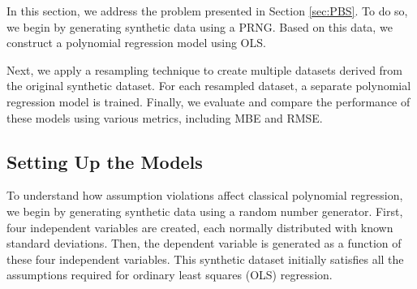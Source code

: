 


In this section, we address the problem presented in Section \ref{sec:PBS}. To do so, we begin by generating synthetic data using a PRNG. Based on this data, we construct a polynomial regression model using OLS.

\noindent Next, we apply a resampling technique to create multiple datasets derived from the original synthetic dataset. For each resampled dataset, a separate polynomial regression model is trained. Finally, we evaluate and compare the performance of these models using various metrics, including MBE and RMSE.

\subsection{Setting Up the Models}
To understand how assumption violations affect classical polynomial regression, we begin by generating synthetic data using a random number generator. First, four independent variables are created, each normally distributed with known standard deviations. Then, the dependent variable is generated as a function of these four independent variables. This synthetic dataset initially satisfies all the assumptions required for ordinary least squares (OLS) regression.
\\\\




